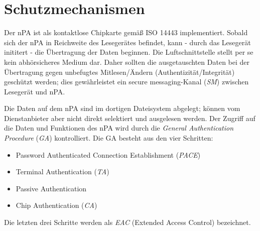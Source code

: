 \documentclass[toc=flat,fontsize=11pt,a4paper,titlepage,headsepline,numbers=noenddot, bibliography=totoc]{scrartcl}
\begin{document}
\section{Schutzmechanismen}

Der nPA ist als kontaktlose Chipkarte gemäß ISO 14443 \cite{ISO14443} implementiert. Sobald sich der nPA in Reichweite des Lesegerätes befindet, kann - durch das 
Lesegerät inititert - die Übertragung der Daten beginnen. Die Luftschnittstelle stellt per se kein abhörsicheres  Medium dar. Daher sollten die ausgetauschten Daten 
bei der Übertragung gegen unbefugtes Mitlesen/Ändern (Authentizität/Integrität) geschützt werden; dies gewährleistet ein secure messaging-Kanal (\textit{SM}) zwischen 
Lesegerät und nPA. 

Die Daten auf dem nPA sind im dortigen Dateisystem abgelegt; können vom Dienstanbieter aber nicht direkt selektiert und ausgelesen werden. Der Zugriff auf 
die Daten und Funktionen des nPA  wird durch die \textit{General Authentication Procedure} (\textit{GA}) \cite{TR3110} kontrolliert. Die GA besteht aus den vier Schritten:
\begin{itemize}
	\item Password Authenticated Connection Establishment (\textit{PACE}) \cite{TR3110}
	\item Terminal Authentication (\textit{TA})
	\item Passive Authentication 
	\item Chip Authentication (\textit{CA}) 
\end{itemize}
Die letzten drei Schritte werden als \textit{EAC} (Extended Access Control) bezeichnet.
\end{document}
